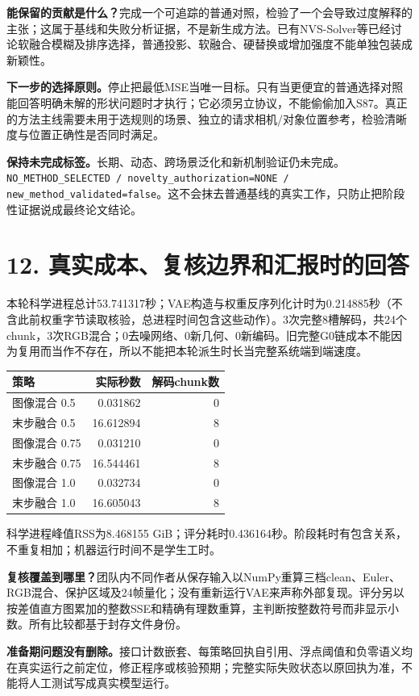 \documentclass[UTF8,10pt,a4paper]{ctexart}
\begin{document}
\textbf{能保留的贡献是什么？}完成一个可追踪的普通对照，检验了一个会导致过度解释的主张；这属于基线和失败分析证据，不是新生成方法。已有NVS-Solver等已经讨论软融合模糊及排序选择，普通投影、软融合、硬替换或增加强度不能单独包装成新颖性。

\textbf{下一步的选择原则。}停止把最低MSE当唯一目标。只有当更便宜的普通选择对照能回答明确未解的形状问题时才执行；它必须另立协议，不能偷偷加入S87。真正的方法主线需要未用于选规则的场景、独立的请求相机/对象位置参考，检验清晰度与位置正确性是否同时满足。

\textbf{保持未完成标签。}长期、动态、跨场景泛化和新机制验证仍未完成。\texttt{NO\_METHOD\_SELECTED / novelty\_authorization=NONE / new\_method\_validated=false}。这不会抹去普通基线的真实工作，只防止把阶段性证据说成最终论文结论。

\clearpage
\section*{12. 真实成本、复核边界和汇报时的回答}
本轮科学进程总计53.741317秒；VAE构造与权重反序列化计时为0.214885秒（不含此前权重字节读取核验，总进程时间包含这些动作）。3次完整8槽解码，共24个chunk，3次RGB混合；0去噪网络、0新几何、0新编码。旧完整G0链成本不能因为复用而当作不存在，所以不能把本轮派生时长当完整系统端到端速度。
\begin{center}\small\begin{tabular}{lrr}\toprule
策略 & 实际秒数 & 解码chunk数\\\midrule
图像混合 0.5 & 0.031862 & 0\\
末步融合 0.5 & 16.612894 & 8\\
图像混合 0.75 & 0.031210 & 0\\
末步融合 0.75 & 16.544461 & 8\\
图像混合 1.0 & 0.032734 & 0\\
末步融合 1.0 & 16.605043 & 8\\
\bottomrule\end{tabular}\end{center}
科学进程峰值RSS为8.468155 GiB；评分耗时0.436164秒。阶段耗时有包含关系，不重复相加；机器运行时间不是学生工时。

\textbf{复核覆盖到哪里？}团队内不同作者从保存输入以NumPy重算三档clean、Euler、RGB混合、保护区域及24帧量化；没有重新运行VAE来声称外部复现。评分另以按差值直方图累加的整数SSE和精确有理数重算，主判断按整数符号而非显示小数。所有比较都基于封存文件身份。

\textbf{准备期问题没有删除。}接口计数嵌套、每策略回执自引用、浮点阈值和负零语义均在真实运行之前定位，修正程序或核验预期；完整实际失败状态以原回执为准，不能将人工测试写成真实模型运行。
\end{document}

